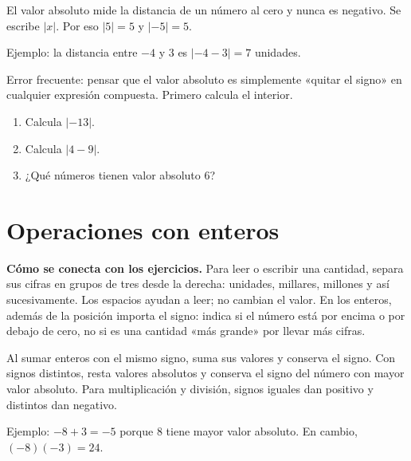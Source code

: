 \documentclass[10pt,oneside,openany]{book}
\begin{document}
El valor absoluto mide la distancia de un número al cero y nunca es negativo. Se escribe $|x|$. Por eso $|5|=5$ y $|-5|=5$.

\begin{ejemplo}
Ejemplo: la distancia entre $-4$ y $3$ es $|-4-3|=7$ unidades.
\end{ejemplo}

\begin{ojo}
Error frecuente: pensar que el valor absoluto es simplemente «quitar el signo» en cualquier expresión compuesta. Primero calcula el interior.
\end{ojo}

\begin{practica}

\begin{enumerate}

\item Calcula $|-13|$.

\item Calcula $|4-9|$.

\item ¿Qué números tienen valor absoluto 6?

\end{enumerate}

\end{practica}



\section{Operaciones con enteros}

\textbf{Cómo se conecta con los ejercicios.} Para leer o escribir una cantidad, separa sus cifras en grupos de tres desde la derecha: unidades, millares, millones y así sucesivamente. Los espacios ayudan a leer; no cambian el valor. En los enteros, además de la posición importa el signo: indica si el número está por encima o por debajo de cero, no si es una cantidad «más grande» por llevar más cifras.

Al sumar enteros con el mismo signo, suma sus valores y conserva el signo. Con signos distintos, resta valores absolutos y conserva el signo del número con mayor valor absoluto. Para multiplicación y división, signos iguales dan positivo y distintos dan negativo.

\begin{ejemplo}
Ejemplo: $-8+3=-5$ porque 8 tiene mayor valor absoluto. En cambio, $(-8)(-3)=24$.
\end{ejemplo}
\end{document}
